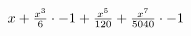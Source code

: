 \documentclass[32pt]{article}
\begin{document}
             
${{{{x} + {{{{x} ^ {3}} \over {6}} \cdot {-1}}} + {{{x} ^ {5}} \over {120}}} + {{{{x} ^ {7}} \over {5040}} \cdot {-1}}}$
\end{document}
